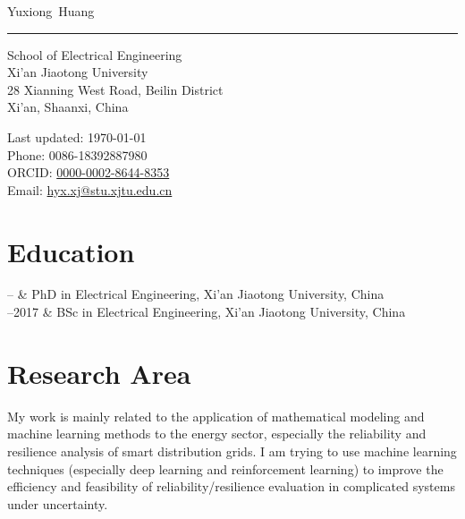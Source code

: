 \documentclass[11pt, a4paper]{article}
\makeatletter
\newcommand{\XJTUEE}{School of Electrical Engineering}
\newcommand{\XJTU}{Xi'an Jiaotong University}
\newcommand{\FirstName}{Yuxiong}
\newcommand{\LastName}{Huang}
\newcommand{\MyName}{\FirstName\ \LastName}
\newcommand{\Email}{hyx.xj@stu.xjtu.edu.cn}
\newcommand{\Phone}{0086-18392887980}
\newcommand{\ORCID}{0000-0002-8644-8353}
\newcommand{\Affiliation}{\XJTUEE \\ \XJTU}
\newcommand{\Address}{
  28 Xianning West Road, Beilin District \\ Xi'an, Shaanxi, China
}
\newcommand{\Duration}[2]{\fontsize{10pt}{0}\selectfont #1--#2}
\makeatother
\begin{document}
\thispagestyle{empty}

{\fontsize{24pt}{0}\selectfont\MyName}\\[-0.1cm]
\rule{\textwidth}{0.2pt}
\begin{minipage}[t]{0.595\textwidth}
  \Affiliation
  \\
  \Address
\end{minipage}
\begin{minipage}[t]{0.405\textwidth}
  \begin{flushright}
  Last updated: \monthyear\today
  \\
    Phone: \Phone
    \\
    ORCID: \href{https://orcid.org/\ORCID}{\ORCID}
    \\
    Email: \href{mailto:\Email}{\Email}
    
  \end{flushright}
\end{minipage}


\section{Education}

\begin{EntriesTable}
  \Duration{2017}{}  &
  PhD in Electrical Engineering, \XJTU, China
  \\
  \Duration{2013}{2017}  &
  BSc in Electrical Engineering, \XJTU, China
\end{EntriesTable}


\section{Research Area}
My work is mainly related to the application of mathematical modeling and machine learning methods to the energy sector, especially the reliability and resilience analysis of smart distribution grids. I am trying to use machine learning techniques (especially deep learning and reinforcement learning) to improve the efficiency and feasibility of reliability/resilience evaluation in complicated systems under uncertainty. 


\end{document}
